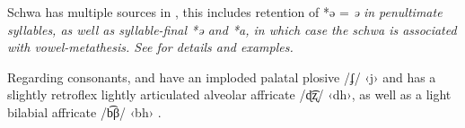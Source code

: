 Schwa has multiple sources in ,
this includes retention of *ə = \it{ə} in penultimate syllables,
as well as syllable-final *ə and *a, in which case the
schwa is associated with vowel-metathesis.
See  for details and examples.

Regarding consonants,  and  have 
an imploded palatal plosive /ʄ/ ‹j{\Q}›
and  has a slightly retroflex lightly
articulated alveolar affricate /ɖ͡ʐ/ ‹dh›,
as well as a light bilabial affricate /b͡β/ ‹bh›
\citep[256]{Grimes2010a}.
